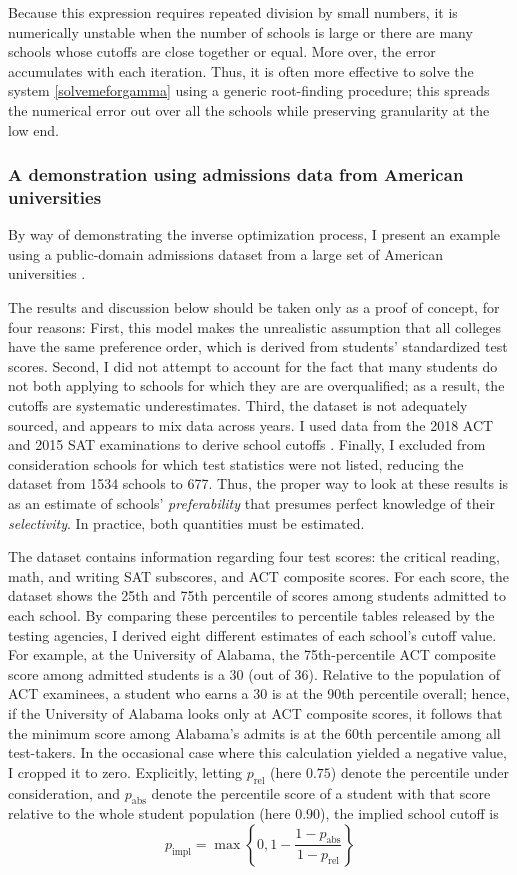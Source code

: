 \documentclass[12pt]{article}
\theoremstyle{definition}
\begin{document}
Because this expression requires repeated division by small numbers, it is numerically unstable when the number of schools is large or there are many schools whose cutoffs are close together or equal. More over, the error accumulates with each iteration. Thus, it is often more effective to solve the system \ref{solvemeforgamma} using a generic root-finding procedure; this spreads the numerical error out over all the schools while preserving granularity at the low end. 

\subsubsection{A demonstration using admissions data from American universities}
By way of demonstrating the inverse optimization process, I present an example using a public-domain admissions dataset from a large set of American universities \parencite[][]{collegeadmissionskaggle}.

The results and discussion below should be taken only as a proof of concept, for four reasons: First, this model makes the unrealistic assumption that all colleges have the same preference order, which is derived from students' standardized test scores. Second, I did not attempt to account for the fact that many students do not both applying to schools for which they are are overqualified; as a result, the cutoffs are systematic underestimates. Third, the dataset is not adequately sourced, and appears to mix data across years. I used data from the 2018 ACT and 2015 SAT examinations to derive school cutoffs \parencite[][]{ACTprofilerpt, SATpercentileranks}. Finally, I excluded from consideration schools for which test statistics were not listed, reducing the dataset from 1534 schools to 677. Thus, the proper way to look at these results is as an estimate of schools' \emph{preferability} that presumes perfect knowledge of their \emph{selectivity}. In practice, both quantities must be estimated.

The dataset contains information regarding four test scores: the critical reading, math, and writing SAT subscores, and ACT composite scores. For each score, the dataset shows the 25th and 75th percentile of scores among students admitted to each school. By comparing these percentiles to percentile tables released by the testing agencies, I derived eight different estimates of each school's cutoff value. For example, at the University of Alabama, the 75th-percentile ACT composite score among admitted students is a 30 (out of 36). Relative to the population of ACT examinees, a student who earns a 30 is at the 90th percentile overall; hence, if the University of Alabama looks only at ACT composite scores, it follows that the minimum score among Alabama's admits is at the 60th percentile among all test-takers. In the occasional case where this calculation yielded a negative value, I cropped it to zero. Explicitly, letting $p_{\text{rel}}$ (here $0.75$) denote the percentile under consideration, and $p_{\text{abs}}$ denote the percentile score of a student with that score relative to the whole student population (here $0.90$), the implied school cutoff is \[p_{\text{impl}} = \max\left\{0, 1 - \frac{1 - p_{\text{abs}}}{1- p_{\text{rel}}}\right\}\]
\end{document}
